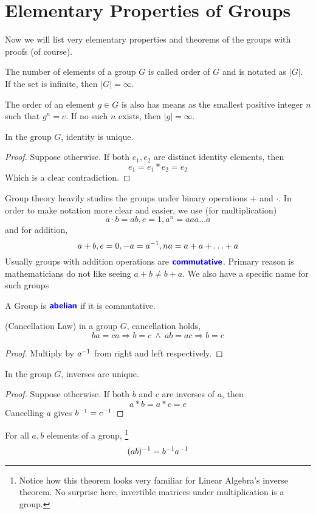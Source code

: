 \section{Elementary Properties of Groups}
Now we will list very elementary properties and theorems of the groups with proofs (of course).
\begin{definition}
    The number of elements of a group $G$ is called \alert{order} of $G$ and is notated as $|G|$. If the set is infinite, then $|G| = \infty$.

    The order of an element $g \in G$ is also has means as the smallest positive integer $n$ such that $g^n = e$. If no such $n$ exists,
    then $|g| = \infty$.
\end{definition}
\begin{theorem}
    In the group $G$, identity is unique.
\end{theorem}
\begin{proof}
    Suppose otherwise. If both $e_1,e_2$ are distinct identity elements, then
    \[ e_1 = e_1 \ast e_2 = e_2\]
    Which is a clear contradiction.
\end{proof}
Group theory heavily studies the groups under binary operations $+$ and $\cdot $. In order to make notation more clear and easier, we use
(for multiplication)
\[ a \cdot b = ab, e = 1, a^n= aaa\ldots a\]
and for addition,
\[ a+b,e = 0, -a = a^{-1}, na= a + a + \ldots + a\]
Usually groups with addition operations are $\textbf{\color{blue}\sffamily commutative}$. Primary reason is mathematicians do not like seeing $a+b \neq b + a$. We
also have a specific name for such groups
\begin{definition*}
    A Group is $\textbf{\color{blue}\sffamily abelian}$ if it is commutative.
\end{definition*}
\begin{theorem}(Cancellation Law)
    in a group $G$, cancellation holds,
    \[ ba = ca \Rightarrow b = c \ \land  \ ab = ac \Rightarrow b = c\]
\end{theorem}
\begin{proof}
    Multiply by $a^{-1}$ from right and left respectively.
\end{proof}
\begin{theorem}
    In the group $G$, inverses are unique.
\end{theorem}
\begin{proof}
    Suppose otherwise. If both $b$ and $c$ are inverses of $a$, then
    \[ a \ast b  = a \ast c = e\]
    Cancelling $a$ gives $b ^{-1} = c ^{-1}$
\end{proof}
\begin{theorem}
    For all $a,b$ elements of a group,
    \footnote{Notice how this theorem looks very familiar for Linear Algebra's inverse theorem. No surprise here, invertible matrices under
    multiplication is a group.}
    \[ (ab)^{-1} = b ^{-1} a ^{-1}\]

\end{theorem}


